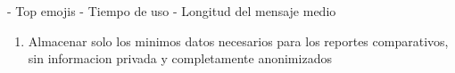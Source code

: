 - Top emojis
- Tiempo de uso
- Longitud del mensaje medio

\begin{enumerate}
    \item Almacenar solo los minimos datos necesarios para los reportes comparativos, sin informacion privada y completamente anonimizados
\end{enumerate}
